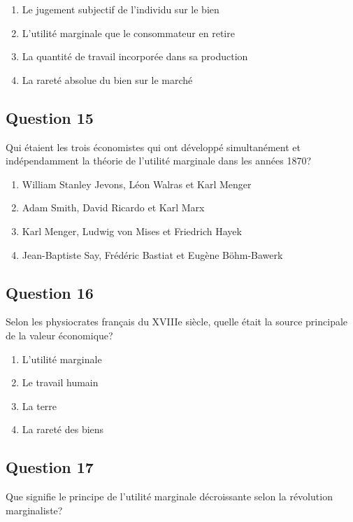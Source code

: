 \documentclass[12pt,a4paper]{article}
\begin{document}
\begin{enumerate}[label=\Alph*., leftmargin=*]
\item Le jugement subjectif de l'individu sur le bien
\item L'utilité marginale que le consommateur en retire
\item La quantité de travail incorporée dans sa production
\item La rareté absolue du bien sur le marché
\end{enumerate}

\bigskip


\subsection*{Question 15}
Qui étaient les trois économistes qui ont développé simultanément et indépendamment la théorie de l'utilité marginale dans les années 1870?

\begin{enumerate}[label=\Alph*., leftmargin=*]
\item William Stanley Jevons, Léon Walras et Karl Menger
\item Adam Smith, David Ricardo et Karl Marx
\item Karl Menger, Ludwig von Mises et Friedrich Hayek
\item Jean-Baptiste Say, Frédéric Bastiat et Eugène Böhm-Bawerk
\end{enumerate}

\bigskip


\subsection*{Question 16}
Selon les physiocrates français du XVIIIe siècle, quelle était la source principale de la valeur économique?

\begin{enumerate}[label=\Alph*., leftmargin=*]
\item L'utilité marginale
\item Le travail humain
\item La terre
\item La rareté des biens
\end{enumerate}

\bigskip


\subsection*{Question 17}
Que signifie le principe de l'utilité marginale décroissante selon la révolution marginaliste?
\end{document}
